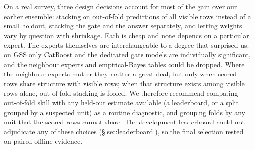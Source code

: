 On a real survey, three design decisions account for most of the gain over our earlier ensemble: stacking on out-of-fold predictions of all visible rows instead of a small holdout, stacking the gate and the answer separately, and letting weights vary by question with shrinkage. Each is cheap and none depends on a particular expert. The experts themselves are interchangeable to a degree that surprised us: on GSS only CatBoost and the dedicated gate models are individually significant, and the neighbour experts and empirical-Bayes tables could be dropped. Where the neighbour experts matter they matter a great deal, but only when scored rows share structure with visible rows; when that structure exists among visible rows alone, out-of-fold stacking is fooled. We therefore recommend comparing out-of-fold skill with any held-out estimate available (a leaderboard, or a split grouped by a suspected unit) as a routine diagnostic, and grouping folds by any unit that the scored rows cannot share. The development leaderboard could not adjudicate any of these choices (\S\ref{sec:leaderboard}), so the final selection rested on paired offline evidence.
